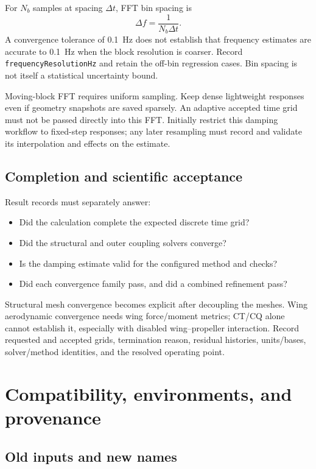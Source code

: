 \documentclass[11pt,a4paper]{article}
\newcommand{\code}{\nolinkurl}
\begin{document}
For $N_b$ samples at spacing $\Delta t$, FFT bin spacing is
\begin{equation}
 \Delta f=\frac{1}{N_b\Delta t}.
\end{equation}
A convergence tolerance of 0.1~Hz does not establish that frequency estimates
are accurate to 0.1~Hz when the block resolution is coarser. Record
\code{frequencyResolutionHz} and retain the off-bin regression cases.
Bin spacing is not itself a statistical uncertainty bound.

Moving-block FFT requires uniform sampling. Keep dense lightweight responses
even if geometry snapshots are saved sparsely. An adaptive accepted time grid
must not be passed directly into this FFT. Initially restrict this damping
workflow to fixed-step responses; any later resampling must record and validate
its interpolation and effects on the estimate.

\subsection{Completion and scientific acceptance}

Result records must separately answer:
\begin{itemize}
\item Did the calculation complete the expected discrete time grid?
\item Did the structural and outer coupling solvers converge?
\item Is the damping estimate valid for the configured method and checks?
\item Did each convergence family pass, and did a combined refinement pass?
\end{itemize}

Structural mesh convergence becomes explicit after decoupling the meshes.
Wing aerodynamic convergence needs wing force/moment metrics; CT/CQ alone
cannot establish it, especially with disabled wing--propeller interaction.
Record requested and accepted grids, termination reason, residual histories,
units/bases, solver/method identities, and the resolved operating point.

\section{Compatibility, environments, and provenance}

\subsection{Old inputs and new names}
\end{document}
